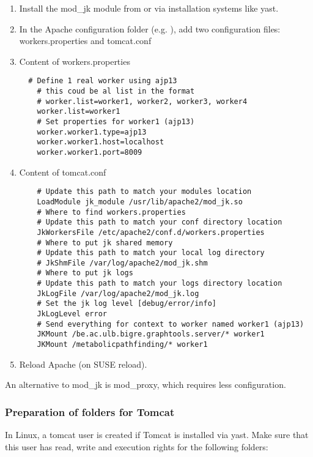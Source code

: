 \documentclass{book}
\begin{document}
\begin{enumerate}
\item Install the mod\_jk module from 
      or via installation systems like yast.
\item In the Apache configuration folder
(e.g. ), add two configuration files: workers.properties and tomcat.conf
\item Content of workers.properties
\begin{footnotesize}
\begin{verbatim}
  # Define 1 real worker using ajp13
    # this coud be al list in the format
    # worker.list=worker1, worker2, worker3, worker4
    worker.list=worker1
    # Set properties for worker1 (ajp13)
    worker.worker1.type=ajp13
    worker.worker1.host=localhost
    worker.worker1.port=8009
\end{verbatim}
\end{footnotesize}
\item Content of tomcat.conf
\begin{footnotesize}
\begin{verbatim}
    # Update this path to match your modules location
    LoadModule jk_module /usr/lib/apache2/mod_jk.so
    # Where to find workers.properties
    # Update this path to match your conf directory location
    JkWorkersFile /etc/apache2/conf.d/workers.properties
    # Where to put jk shared memory
    # Update this path to match your local log directory
    # JkShmFile /var/log/apache2/mod_jk.shm
    # Where to put jk logs
    # Update this path to match your logs directory location
    JkLogFile /var/log/apache2/mod_jk.log
    # Set the jk log level [debug/error/info]
    JkLogLevel error
    # Send everything for context to worker named worker1 (ajp13)
    JKMount /be.ac.ulb.bigre.graphtools.server/* worker1
    JKMount /metabolicpathfinding/* worker1
\end{verbatim}
\end{footnotesize}
\item Reload Apache (on SUSE  reload).
\end{enumerate}

An alternative to mod\_jk is mod\_proxy, which requires less configuration.

\subsubsection{Preparation of folders for Tomcat}
In Linux, a tomcat user is created if Tomcat is installed via yast. Make sure
that this user has read, write and execution rights for the following folders:\\
\\
\\
\\
\\
\\
\end{document}
